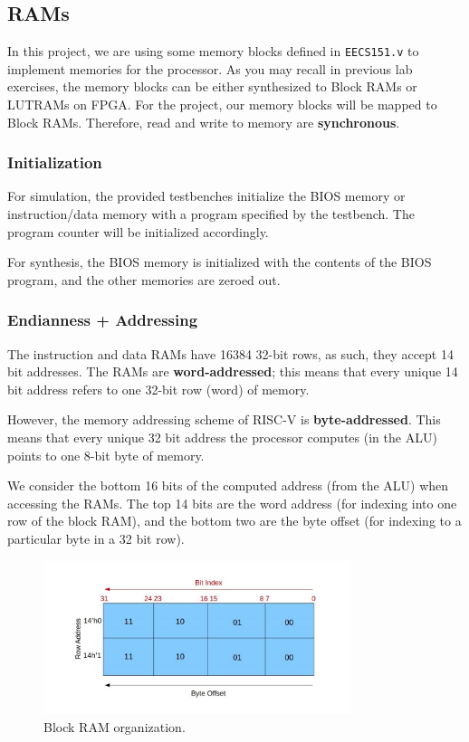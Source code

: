 \subsection{RAMs}
In this project, we are using some memory blocks defined in \verb|EECS151.v| to implement memories for the processor.
As you may recall in previous lab exercises, the memory blocks can be either synthesized to Block RAMs or LUTRAMs on FPGA.
For the project, our memory blocks will be mapped to Block RAMs. Therefore, read and write to memory are \textbf{synchronous}.

\subsubsection{Initialization}
For simulation, the provided testbenches initialize the BIOS memory or instruction/data memory with a program specified by the testbench. The program counter will be initialized accordingly.

For synthesis, the BIOS memory is initialized with the contents of the BIOS program, and the other memories are zeroed out.

\subsubsection{Endianness + Addressing}
The instruction and data RAMs have 16384 32-bit rows, as such, they accept 14 bit addresses.
The RAMs are \textbf{word-addressed}; this means that every unique 14 bit address refers to one 32-bit row (word) of memory.

However, the memory addressing scheme of RISC-V is \textbf{byte-addressed}.
This means that every unique 32 bit address the processor computes (in the ALU) points to one 8-bit byte of memory.

We consider the bottom 16 bits of the computed address (from the ALU) when accessing the RAMs.
The top 14 bits are the word address (for indexing into one row of the block RAM), and the bottom two are the byte offset (for indexing to a particular byte in a 32 bit row).

\begin{figure}[H]
  \begin{center}
    \includegraphics[width=0.8\textwidth]{figs/endianness_img.jpg}
    \caption{Block RAM organization.}
    \label{fig:endianness_img}
  \end{center}
\end{figure}

